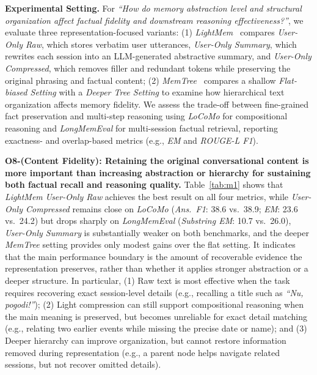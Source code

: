 \noindent \textbf{Experimental Setting.}
For \textit{``How do memory abstraction level and structural organization affect factual fidelity and downstream reasoning effectiveness?''}, we evaluate three representation-focused variants:
(1) \textit{LightMem}~\cite{LightMem} compares \textit{User-Only Raw}, which stores verbatim user utterances, \textit{User-Only Summary}, which rewrites each session into an LLM-generated abstractive summary, and \textit{User-Only Compressed}, which removes filler and redundant tokens while preserving the original phrasing and factual content;
(2) \textit{MemTree}~\cite{MemTree} compares a shallow \textit{Flat-biased Setting} with a \textit{Deeper Tree Setting} to examine how hierarchical text organization affects memory fidelity.
We assess the trade-off between fine-grained fact preservation and multi-step reasoning using \textit{LoCoMo} for compositional reasoning and \textit{LongMemEval} for multi-session factual retrieval, reporting exactness- and overlap-based metrics (e.g., \textit{EM} and \textit{ROUGE-L F1}).

\noindent \textbf{O8-(Content Fidelity): Retaining the original conversational content is more important than increasing abstraction or hierarchy for sustaining both factual recall and reasoning quality.}
Table~\ref{tab:m1} shows that \textit{LightMem} \textit{User-Only Raw} achieves the best result on all four metrics, while \textit{User-Only Compressed} remains close on \textit{LoCoMo} (\textit{Ans.\ F1}: 38.6 vs.\ 38.9; \textit{EM}: 23.6 vs.\ 24.2) but drops sharply on \textit{LongMemEval} (\textit{Substring EM}: 10.7 vs.\ 26.0), \textit{User-Only Summary} is substantially weaker on both benchmarks, and the deeper \textit{MemTree} setting provides only modest gains over the flat setting.
It indicates that the main performance boundary is the amount of recoverable evidence the representation preserves, rather than whether it applies stronger abstraction or a deeper structure.
In particular, (1) Raw text is most effective when the task requires recovering exact session-level details (e.g., recalling a title such as \textit{``Nu, pogodi!''}); (2) Light compression can still support compositional reasoning when the main meaning is preserved, but becomes unreliable for exact detail matching (e.g., relating two earlier events while missing the precise date or name); and (3) Deeper hierarchy can improve organization, but cannot restore information removed during representation (e.g., a parent node helps navigate related sessions, but not recover omitted details).

